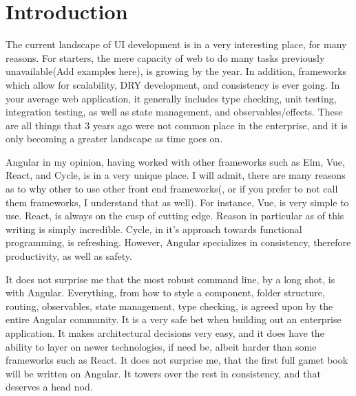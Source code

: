 \maketitle{}
\section{Introduction}

The current landscape of UI development is in a very interesting place, for many
reasons. For starters, the mere capacity of web to do many tasks previously
unavailable(Add examples here), is growing by the year. In addition, frameworks
which allow for scalability, DRY development, and consistency is ever going. In
your average web application, it generally includes type checking, unit testing,
integration testing, as well as state management, and observables/effects. These
are all things that 3 years ago were not common place in the enterprise, and it
is only becoming a greater landscape as time goes on.

Angular in my opinion, having worked with other frameworks such as Elm, Vue,
React, and Cycle, is in a very unique place. I will admit, there are many
reasons as to why other to use other front end frameworks(, or if you prefer to
not call them frameworks, I understand that as well). For instance, Vue, is very
simple to use. React, is always on the cusp of cutting edge. Reason in
particular as of this writing is simply incredible. Cycle, in it's approach
towards functional programming, is refreshing. However, Angular specializes in
consistency, therefore productivity, as well as safety.

It does not surprise me that the most robust command line, by a long shot, is
with Angular. Everything, from how to style a component, folder structure,
routing, observables, state management, type checking, is agreed upon by the
entire Angular community. It is a very safe bet when building out an enterprise
application. It makes architectural decisions very easy, and it does have the
ability to layer on newer technologies, if need be, albeit harder than some
frameworks such as React. It does not surprise me, that the first full gamet
book will be written on Angular. It towers over the rest in consistency, and
that deserves a head nod.

